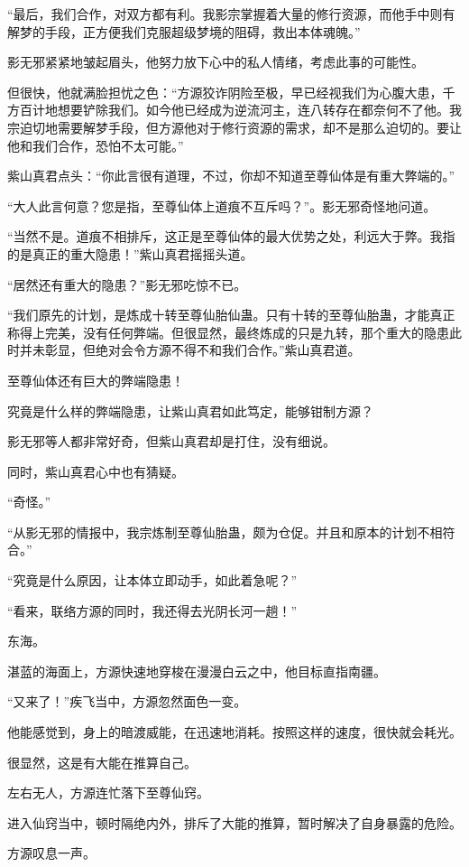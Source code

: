 \begin{this_body}
“最后，我们合作，对双方都有利。我影宗掌握着大量的修行资源，而他手中则有解梦的手段，正方便我们克服超级梦境的阻碍，救出本体魂魄。”

影无邪紧紧地皱起眉头，他努力放下心中的私人情绪，考虑此事的可能性。

但很快，他就满脸担忧之色：“方源狡诈阴险至极，早已经视我们为心腹大患，千方百计地想要铲除我们。如今他已经成为逆流河主，连八转存在都奈何不了他。我宗迫切地需要解梦手段，但方源他对于修行资源的需求，却不是那么迫切的。要让他和我们合作，恐怕不太可能。”

紫山真君点头：“你此言很有道理，不过，你却不知道至尊仙体是有重大弊端的。”

“大人此言何意？您是指，至尊仙体上道痕不互斥吗？”。影无邪奇怪地问道。

“当然不是。道痕不相排斥，这正是至尊仙体的最大优势之处，利远大于弊。我指的是真正的重大隐患！”紫山真君摇摇头道。

“居然还有重大的隐患？”影无邪吃惊不已。

“我们原先的计划，是炼成十转至尊仙胎仙蛊。只有十转的至尊仙胎蛊，才能真正称得上完美，没有任何弊端。但很显然，最终炼成的只是九转，那个重大的隐患此时并未彰显，但绝对会令方源不得不和我们合作。”紫山真君道。

至尊仙体还有巨大的弊端隐患！

究竟是什么样的弊端隐患，让紫山真君如此笃定，能够钳制方源？

影无邪等人都非常好奇，但紫山真君却是打住，没有细说。

同时，紫山真君心中也有猜疑。

“奇怪。”

“从影无邪的情报中，我宗炼制至尊仙胎蛊，颇为仓促。并且和原本的计划不相符合。”

“究竟是什么原因，让本体立即动手，如此着急呢？”

“看来，联络方源的同时，我还得去光阴长河一趟！”

东海。

湛蓝的海面上，方源快速地穿梭在漫漫白云之中，他目标直指南疆。

“又来了！”疾飞当中，方源忽然面色一变。

他能感觉到，身上的暗渡威能，在迅速地消耗。按照这样的速度，很快就会耗光。

很显然，这是有大能在推算自己。

左右无人，方源连忙落下至尊仙窍。

进入仙窍当中，顿时隔绝内外，排斥了大能的推算，暂时解决了自身暴露的危险。

方源叹息一声。


\end{this_body}

